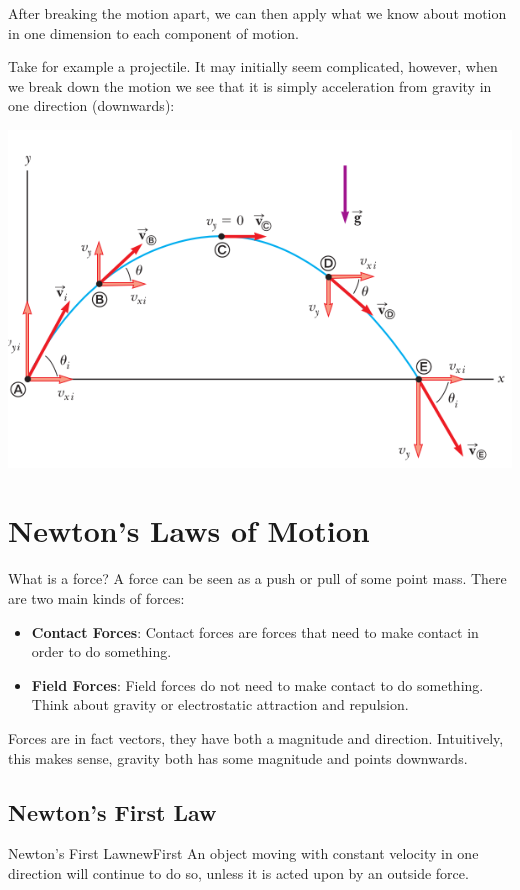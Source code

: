\documentclass{report}
\begin{document}
After breaking the motion apart, we can then apply what we know about motion in one dimension to each component of motion.

Take for example a projectile. It may initially seem complicated, however, when we break down the motion we see that it is simply acceleration from gravity in one direction (downwards):

\includegraphics[scale=0.4]{proj.png}


\section{Newton's Laws of Motion}

What is a force? A force can be seen as a push or pull of some point mass. There are two main kinds of forces:
\begin{itemize}
    \item \textbf{Contact Forces}: Contact forces are forces that need to make contact in order to do something.
    \item \textbf{Field Forces}: Field forces do not need to make contact to do something. Think about gravity or electrostatic attraction and repulsion. 
\end{itemize}

Forces are in fact vectors, they have both a magnitude and direction. Intuitively, this makes sense, gravity both has some magnitude and points downwards.

\subsection{Newton's First Law}

\begin{mytheo}{Newton's First Law}{newFirst}
    An object moving with constant velocity in one direction will continue to do so, unless it is acted upon by an outside force.
\end{mytheo}
\end{document}

